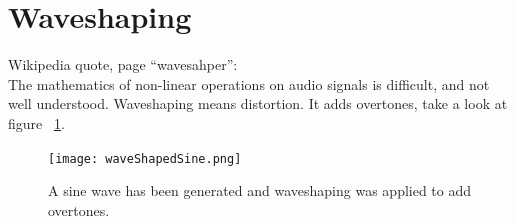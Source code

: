 









\section{Waveshaping}
Wikipedia quote, page ``wavesahper'':\\
\glqq{}The mathematics of non-linear operations on audio signals is difficult, and not well understood.\grqq{}
Waveshaping means distortion. It adds overtones, take a look at figure ~\ref{fig:waveshapedSIne}.


\begin{figure}[h!]
	\centering
	\texttt{[image: waveShapedSine.png]}
	\caption[Wave shaped sine oscillator]
	{A sine wave has been generated and waveshaping was applied to add overtones.}
	\label{fig:waveshapedSIne}
\end{figure}


